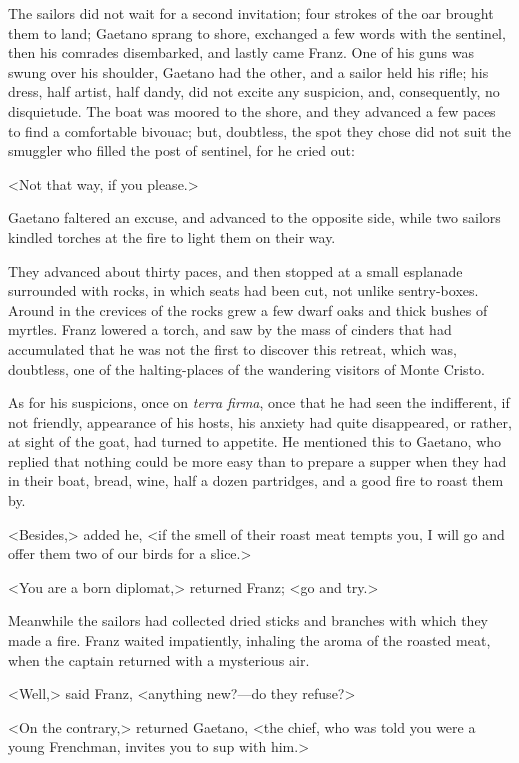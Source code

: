  The sailors did not wait for a second invitation; four strokes of the oar brought them to land; Gaetano sprang to shore, exchanged a few words with the sentinel, then his comrades disembarked, and lastly came Franz. One of his guns was swung over his shoulder, Gaetano had the other, and a sailor held his rifle; his dress, half artist, half dandy, did not excite any suspicion, and, consequently, no disquietude. The boat was moored to the shore, and they advanced a few paces to find a comfortable bivouac; but, doubtless, the spot they chose did not suit the smuggler who filled the post of sentinel, for he cried out: 

 <Not that way, if you please.> 

 Gaetano faltered an excuse, and advanced to the opposite side, while two sailors kindled torches at the fire to light them on their way. 

 They advanced about thirty paces, and then stopped at a small esplanade surrounded with rocks, in which seats had been cut, not unlike sentry-boxes. Around in the crevices of the rocks grew a few dwarf oaks and thick bushes of myrtles. Franz lowered a torch, and saw by the mass of cinders that had accumulated that he was not the first to discover this retreat, which was, doubtless, one of the halting-places of the wandering visitors of Monte Cristo. 

 As for his suspicions, once on \textit{terra firma}, once that he had seen the indifferent, if not friendly, appearance of his hosts, his anxiety had quite disappeared, or rather, at sight of the goat, had turned to appetite. He mentioned this to Gaetano, who replied that nothing could be more easy than to prepare a supper when they had in their boat, bread, wine, half a dozen partridges, and a good fire to roast them by. 

 <Besides,> added he, <if the smell of their roast meat tempts you, I will go and offer them two of our birds for a slice.> 

 <You are a born diplomat,> returned Franz; <go and try.> 

 Meanwhile the sailors had collected dried sticks and branches with which they made a fire. Franz waited impatiently, inhaling the aroma of the roasted meat, when the captain returned with a mysterious air. 

 <Well,> said Franz, <anything new?—do they refuse?> 

 <On the contrary,> returned Gaetano, <the chief, who was told you were a young Frenchman, invites you to sup with him.> 

